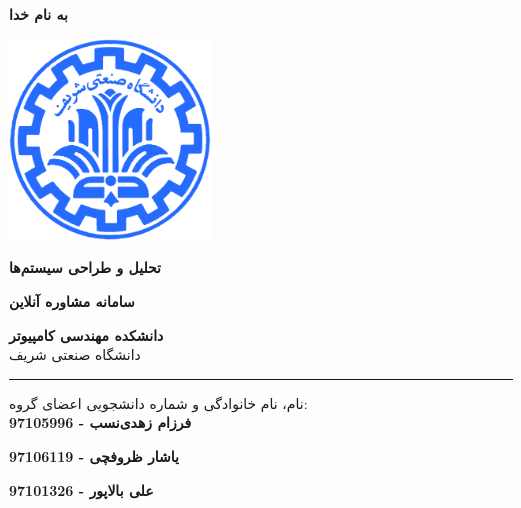 \documentclass[12pt,titlepage,a4page , tikz , multi,table , svgnames,xcdraw]{article}
\begin{document}
\begin{titlepage}

 \begin{center}

       \vspace*{0.5cm}

 \vspace{0.5cm}
       \textbf{ \Huge{به نام خدا} }
       \vspace{0.2cm}

       \includegraphics[width=0.4\textwidth]{Images/sharif.png}

 	\vspace{0.3cm}
       \textbf{ \LARGE{تحلیل و طراحی سیستم‌ها} }


   \vspace{0.3cm}
  \textbf{ \Large{سامانه مشاوره آنلاین} }
   \vspace{0.3cm}


      \large \textbf{دانشکده مهندسی کامپیوتر}\\\vspace{0.2cm}
    \large   دانشگاه صنعتی شریف\\\vspace{0.25cm}

    \vspace{0.15cm}
    \noindent\rule[1ex]{\linewidth}{3pt}

    \vspace{0.5cm}
نام، نام خانوادگی و شماره دانشجویی اعضای گروه:\\


        \textbf{{فرزام زهدی‌نسب - 97105996}}
        \vspace{0.05cm}

        \textbf{{یاشار ظروفچی - 97106119}}
        \vspace{0.05cm}

        \textbf{{علی بالاپور - 97101326}}
        \vspace{0.05cm}
        

\end{center}
\end{titlepage}
\end{document}
